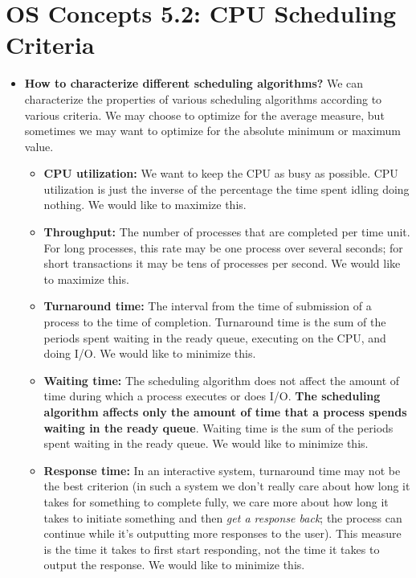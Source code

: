 \documentclass[12pt]{article}
\begin{document}
\section*{OS Concepts 5.2: CPU Scheduling Criteria}

\begin{itemize}
    \item \textbf{How to characterize different scheduling algorithms?} We can characterize the properties of various scheduling algorithms according to various criteria. We may choose to optimize for the average measure, but sometimes we may want to optimize for the absolute minimum or maximum value.
        \begin{itemize}
            \item \textbf{CPU utilization:} We want to keep the CPU as busy as possible. CPU utilization is just the inverse of the percentage the time spent idling doing nothing. We would like to maximize this.
            \item \textbf{Throughput:} The number of processes that are completed per time unit. For long processes, this rate may be one process over several seconds; for short transactions it may be tens of processes per second. We would like to maximize this.
            \item \textbf{Turnaround time:} The interval from the time of submission of a process to the time of completion. Turnaround time is the sum of the periods spent waiting in the ready queue, executing on the CPU, and doing I/O. We would like to minimize this.
            \item \textbf{Waiting time:} The scheduling algorithm does not affect the amount of time during which a process executes or does I/O. \textbf{The scheduling algorithm affects only the amount of time that a process spends waiting in the ready queue}. Waiting time is the sum of the periods spent waiting in the ready queue. We would like to minimize this.
            \item \textbf{Response time:} In an interactive system, turnaround time may not be the best criterion (in such a system we don't really care about how long it takes for something to complete fully, we care more about how long it takes to initiate something and then \textit{get a response back}; the process can continue while it's outputting more responses to the user). This measure is the time it takes to first start responding, not the time it takes to output the response. We would like to minimize this.
        \end{itemize}
\end{itemize}
\end{document}
